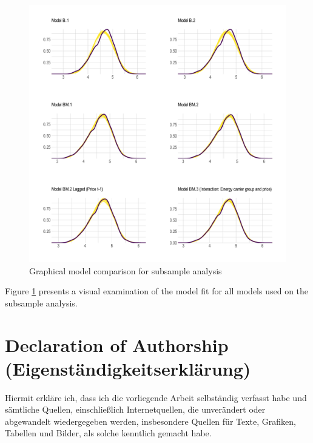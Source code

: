\documentclass[12pt,twoside]{reedthesis}
\begin{document}
\newpage
\begin{figure}

{\centering \includegraphics[width=1\linewidth]{figure/plot-model-comparison} 

}

\caption{Graphical model comparison for subsample analysis}\label{fig:plot-model-comparison}
\end{figure}
\noindent
Figure \ref{fig:plot-model-comparison} presents a visual examination of the model fit for all models used on the subsample analysis.

\newpage

\onehalfspacing

\hypertarget{declaration-of-authorship-eigenstuxe4ndigkeitserkluxe4rung}{%
\chapter*{Declaration of Authorship (Eigenständigkeitserklärung)}\label{declaration-of-authorship-eigenstuxe4ndigkeitserkluxe4rung}}

Hiermit erkläre ich, dass ich die vorliegende Arbeit selbständig verfasst habe und sämtliche Quellen, einschließlich Internetquellen, die unverändert oder abgewandelt wiedergegeben werden, insbesondere Quellen für Texte, Grafiken, Tabellen und Bilder, als solche kenntlich gemacht habe.
\end{document}
